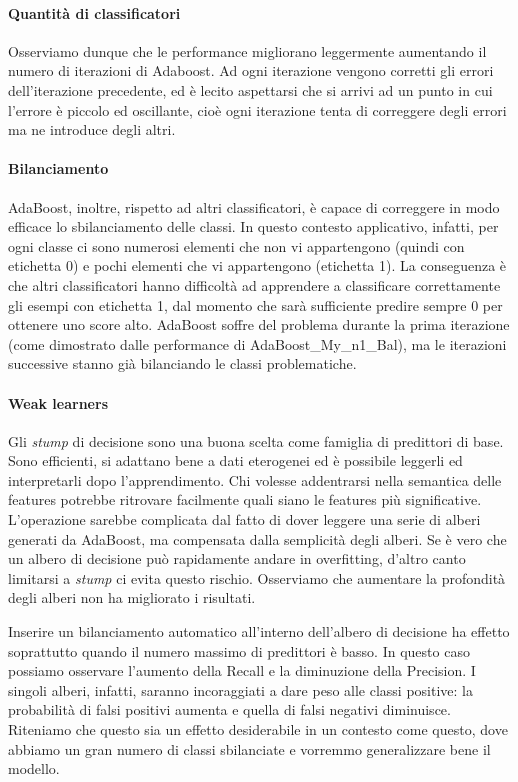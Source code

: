 \documentclass[12pt,a4paper,oneside,hidelinks]{report}
\begin{document}
\paragraph{Quantità di classificatori}
Osserviamo dunque che le performance migliorano leggermente aumentando il numero di iterazioni di Adaboost. Ad ogni iterazione vengono corretti gli errori dell'iterazione precedente, ed è lecito aspettarsi che si arrivi ad un punto in cui l'errore è piccolo ed oscillante, cioè ogni iterazione tenta di correggere degli errori ma ne introduce degli altri.

\paragraph{Bilanciamento}
AdaBoost, inoltre, rispetto ad altri classificatori, è capace di correggere in modo efficace lo sbilanciamento delle classi. In questo contesto applicativo, infatti, per ogni classe ci sono numerosi elementi che non vi appartengono (quindi con etichetta 0) e pochi elementi che vi appartengono (etichetta 1). La conseguenza è che altri classificatori hanno difficoltà ad apprendere a classificare correttamente gli esempi con etichetta 1, dal momento che sarà sufficiente predire sempre 0 per ottenere uno score alto. AdaBoost soffre del problema durante la prima iterazione (come dimostrato dalle performance di AdaBoost\_My\_n1\_Bal), ma le iterazioni successive stanno già bilanciando le classi problematiche.

\paragraph{Weak learners}
Gli \emph{stump} di decisione sono una buona scelta come famiglia di predittori di base. Sono efficienti, si adattano bene a dati eterogenei ed è possibile leggerli ed interpretarli dopo l'apprendimento. Chi volesse addentrarsi nella semantica delle features potrebbe ritrovare facilmente quali siano le features più significative. L'operazione sarebbe complicata dal fatto di dover leggere una serie di alberi generati da AdaBoost, ma compensata dalla semplicità degli alberi. Se è vero che un albero di decisione può rapidamente andare in overfitting, d'altro canto limitarsi a \textit{stump} ci evita questo rischio. Osserviamo che aumentare la profondità degli alberi non ha migliorato i risultati.

Inserire un bilanciamento automatico all'interno dell'albero di decisione ha effetto soprattutto quando il numero massimo di predittori è basso. In questo caso possiamo osservare l'aumento della Recall e la diminuzione della Precision. I singoli alberi, infatti, saranno incoraggiati a dare peso alle classi positive: la probabilità di falsi positivi aumenta e quella di falsi negativi diminuisce. Riteniamo che questo sia un effetto desiderabile in un contesto come questo, dove abbiamo un gran numero di classi sbilanciate e vorremmo generalizzare bene il modello. 
\end{document}
